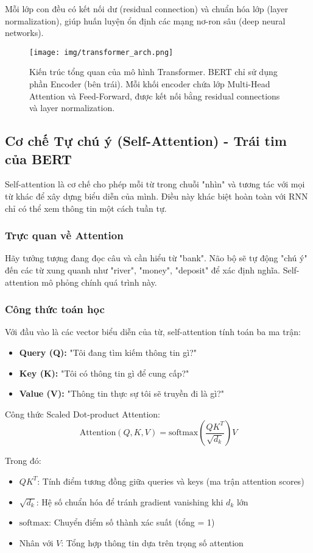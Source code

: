 Mỗi lớp con đều có kết nối dư (residual connection) và chuẩn hóa lớp (layer normalization), giúp huấn luyện ổn định các mạng nơ-ron sâu (deep neural networks).

\begin{figure}[H]
    \centering
    \texttt{[image: img/transformer\_arch.png]}
    \caption{Kiến trúc tổng quan của mô hình Transformer. BERT chỉ sử dụng phần Encoder (bên trái). Mỗi khối encoder chứa lớp Multi-Head Attention và Feed-Forward, được kết nối bằng residual connections và layer normalization.}
    \label{fig:transformer_architecture}
\end{figure}

\subsection{Cơ chế Tự chú ý (Self-Attention) - Trái tim của BERT}
\label{ssec:self_attention}
Self-attention là cơ chế cho phép mỗi từ trong chuỗi "nhìn" và tương tác với mọi từ khác để xây dựng biểu diễn của mình. Điều này khác biệt hoàn toàn với RNN chỉ có thể xem thông tin một cách tuần tự.

\subsubsection{Trực quan về Attention}
Hãy tưởng tượng đang đọc câu và cần hiểu từ "bank". Não bộ sẽ tự động "chú ý" đến các từ xung quanh như "river", "money", "deposit" để xác định nghĩa. Self-attention mô phỏng chính quá trình này.

\subsubsection{Công thức toán học}
Với đầu vào là các vector biểu diễn của từ, self-attention tính toán ba ma trận:
\begin{itemize}
    \item \textbf{Query (Q):} "Tôi đang tìm kiếm thông tin gì?"
    \item \textbf{Key (K):} "Tôi có thông tin gì để cung cấp?"
    \item \textbf{Value (V):} "Thông tin thực sự tôi sẽ truyền đi là gì?"
\end{itemize}

Công thức Scaled Dot-product Attention:
$$ \text{Attention}(Q, K, V) = \text{softmax}\left(\frac{QK^T}{\sqrt{d_k}}\right)V $$

Trong đó:
\begin{itemize}
    \item $QK^T$: Tính điểm tương đồng giữa queries và keys (ma trận attention scores)
    \item $\sqrt{d_k}$: Hệ số chuẩn hóa để tránh gradient vanishing khi $d_k$ lớn
    \item $\text{softmax}$: Chuyển điểm số thành xác suất (tổng = 1)
    \item Nhân với $V$: Tổng hợp thông tin dựa trên trọng số attention
\end{itemize}

